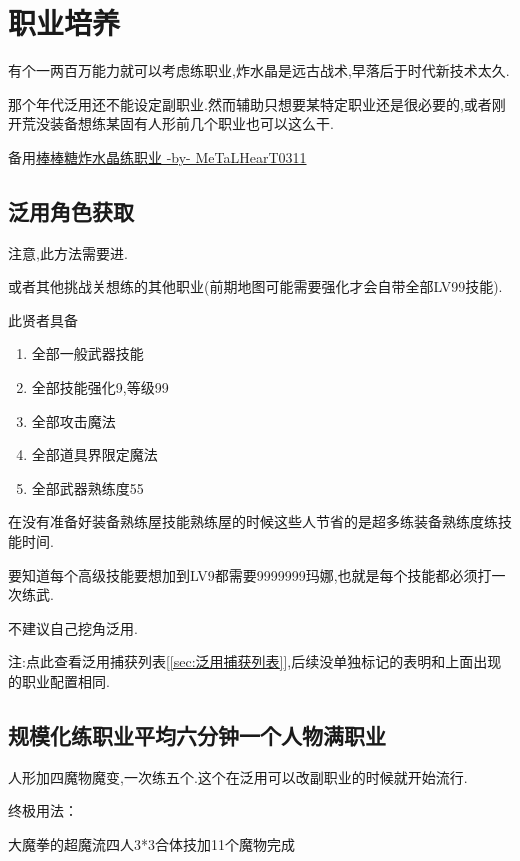 	\section{职业培养}

	有个一两百万能力就可以考虑练职业,炸水晶是远古战术,早落后于时代新技术太久.

	那个年代泛用还不能设定副职业.然而辅助只想要某特定职业还是很必要的,或者刚开荒没装备想练某固有人形前几个职业也可以这么干.

	备用\href{http://tieba.baidu.com/p/3717431968}{棒棒糖炸水晶练职业 -by- MeTaLHearT0311}

		\subsection{泛用角色获取}

		注意,此方法需要进{\color{red}{修罗以后}}.

		{\color{red}{去兔兔魔界挑战关,抓捕贤者}}或者其他挑战关想练的其他职业(前期地图可能需要强化才会自带全部LV99技能).

		此贤者具备
		\begin{enumerate}
			\item 全部一般武器技能
			\item 全部技能强化9,等级99
			\item 全部攻击魔法
			\item 全部道具界限定魔法
			\item 全部武器熟练度55
		\end{enumerate}
		
		在没有准备好装备熟练屋技能熟练屋的时候这些人节省的是超多练装备熟练度练技能时间.

		要知道每个高级技能要想加到LV9都需要9999999玛娜,也就是每个技能都必须打一次练武.

		不建议自己挖角泛用.

		注:点此查看泛用捕获列表[\ref{sec:泛用捕获列表}],后续没单独标记的表明和上面出现的职业配置相同.


		\subsection{规模化练职业平均六分钟一个人物满职业}


		人形加四魔物魔变,一次练五个.这个在泛用可以改副职业的时候就开始流行.

		终极用法：

		大魔拳的超魔流四人3*3合体技加11个魔物完成

		{\color{red}{修罗巴尔必备杰洛肯,有男主最好,需要大量千万级能力角色,所以这步可视为本修罗巴尔攻略法的必经之路}}

